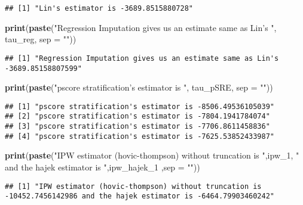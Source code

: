 \documentclass[]{article}
\newenvironment{Shaded}{\begin{snugshade}}{\end{snugshade}}
\newcommand{\KeywordTok}[1]{\textcolor[rgb]{0.13,0.29,0.53}{\textbf{#1}}}
\newcommand{\DataTypeTok}[1]{\textcolor[rgb]{0.13,0.29,0.53}{#1}}
\newcommand{\DecValTok}[1]{\textcolor[rgb]{0.00,0.00,0.81}{#1}}
\newcommand{\StringTok}[1]{\textcolor[rgb]{0.31,0.60,0.02}{#1}}
\newcommand{\NormalTok}[1]{#1}
\begin{document}
\begin{verbatim}
## [1] "Lin's estimator is -3689.8515880728"
\end{verbatim}

\begin{Shaded}
\begin{Highlighting}[]
\KeywordTok{print}\NormalTok{(}\KeywordTok{paste}\NormalTok{(}\StringTok{"Regression Imputation gives us an estimate same as Lin's "}\NormalTok{, tau_reg, }\DataTypeTok{sep =} \StringTok{""}\NormalTok{))}
\end{Highlighting}
\end{Shaded}

\begin{verbatim}
## [1] "Regression Imputation gives us an estimate same as Lin's -3689.85158807599"
\end{verbatim}

\begin{Shaded}
\begin{Highlighting}[]
\KeywordTok{print}\NormalTok{(}\KeywordTok{paste}\NormalTok{(}\StringTok{"pscore stratification's estimator is "}\NormalTok{, tau_pSRE, }\DataTypeTok{sep =} \StringTok{""}\NormalTok{))}
\end{Highlighting}
\end{Shaded}

\begin{verbatim}
## [1] "pscore stratification's estimator is -8506.49536105039"
## [2] "pscore stratification's estimator is -7804.1941784074" 
## [3] "pscore stratification's estimator is -7706.8611458836" 
## [4] "pscore stratification's estimator is -7625.53852433987"
\end{verbatim}

\begin{Shaded}
\begin{Highlighting}[]
\KeywordTok{print}\NormalTok{(}\KeywordTok{paste}\NormalTok{(}\StringTok{"IPW estimator (hovic-thompson) without truncation is "}\NormalTok{,ipw_}\DecValTok{1}\NormalTok{, }\StringTok{" and the hajek estimator is "}\NormalTok{,ipw_hajek_}\DecValTok{1}\NormalTok{ ,}\DataTypeTok{sep =} \StringTok{""}\NormalTok{))}
\end{Highlighting}
\end{Shaded}

\begin{verbatim}
## [1] "IPW estimator (hovic-thompson) without truncation is -10452.7456142986 and the hajek estimator is -6464.79903460242"
\end{verbatim}
\end{document}
